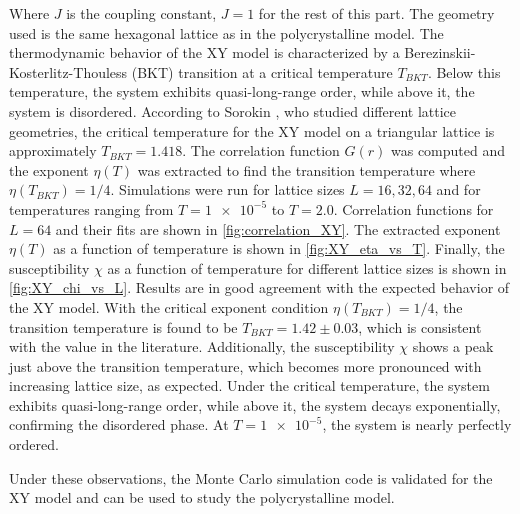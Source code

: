 Where $J$ is the coupling constant, $J = 1$ for the rest of this part. The geometry used is the same hexagonal lattice as in the polycrystalline model. The thermodynamic behavior of the XY model is characterized by a Berezinskii-Kosterlitz-Thouless (BKT) \cite{Kosterlitz1973} transition at a critical temperature $T_{BKT}$. Below this temperature, the system exhibits quasi-long-range order, while above it, the system is disordered. According to Sorokin \cite{Sorokin2019}, who studied different lattice geometries, the critical temperature for the XY model on a triangular lattice is approximately $T_{BKT} = 1.418$. The correlation function $G(r)$ was computed and the exponent $\eta(T)$ was extracted to find the transition temperature where $\eta(T_{BKT}) = 1/4$. Simulations were run for lattice sizes $L = 16, 32, 64$ and for temperatures ranging from $T = \num{1e-5}$ to $T = 2.0$. Correlation functions for $L = 64$ and their fits are shown in \cref{fig:correlation_XY}. The extracted exponent $\eta(T)$ as a function of temperature is shown in \cref{fig:XY_eta_vs_T}. Finally, the susceptibility $\chi$ as a function of temperature for different lattice sizes is shown in \cref{fig:XY_chi_vs_L}. Results are in good agreement with the expected behavior of the XY model. With the critical exponent condition $\eta(T_{BKT}) = 1/4$, the transition temperature is found to be $T_{BKT} = 1.42 \pm 0.03$, which is consistent with the value in the literature. Additionally, the susceptibility $\chi$ shows a peak just above the transition temperature, which becomes more pronounced with increasing lattice size, as expected. Under the critical temperature, the system exhibits quasi-long-range order, while above it, the system decays exponentially, confirming the disordered phase. At $T = \num{1e-5}$, the system is nearly perfectly ordered. 

Under these observations, the Monte Carlo simulation code is validated for the XY model and can be used to study the polycrystalline model.

